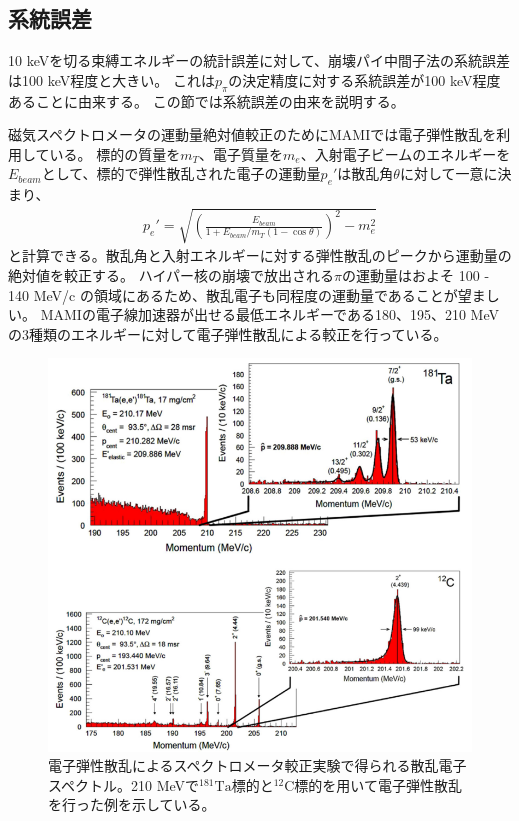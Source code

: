 \documentclass[a4paper,11pt,uplatex]{jsbook}
\begin{document}
\subsection{系統誤差}
10 keVを切る束縛エネルギーの統計誤差に対して、崩壊パイ中間子法の系統誤差は100 keV程度と大きい。
これは$p_\pi$の決定精度に対する系統誤差が100 keV程度あることに由来する。
この節では系統誤差の由来を説明する。

磁気スペクトロメータの運動量絶対値較正のためにMAMIでは電子弾性散乱を利用している。
標的の質量を$m_T$、電子質量を$m_e$、入射電子ビームのエネルギーを$E_{beam}$として、標的で弾性散乱された電子の運動量$p_e'$は散乱角$\theta$に対して一意に決まり、
\begin{eqnarray}
  p_e' = \sqrt{\left(\frac{E_{beam}}{1 + E_{beam}/m_T(1 - \cos{\theta})} \right)^2 - m_e^2}\label{elastic scattering}
\end{eqnarray}
と計算できる。散乱角と入射エネルギーに対する弾性散乱のピークから運動量の絶対値を較正する。
ハイパー核の崩壊で放出される$\pi$の運動量はおよそ 100 - 140 MeV/c の領域にあるため、散乱電子も同程度の運動量であることが望ましい。
MAMIの電子線加速器が出せる最低エネルギーである180、195、210 MeVの3種類のエネルギーに対して電子弾性散乱による較正を行っている。
\begin{figure}[h]
  \centering
  \includegraphics[width=0.8\linewidth]{image/1-elastic.png}
  \caption[電子弾性散乱によるスペクトロメータ較正]{電子弾性散乱によるスペクトロメータ較正実験で得られる散乱電子スペクトル。210 MeVで$^{181}\text{Ta}$標的と$^{12}\text{C}$標的を用いて電子弾性散乱を行った例を示している。\cite{elastic}}
\end{figure}
\end{document}
